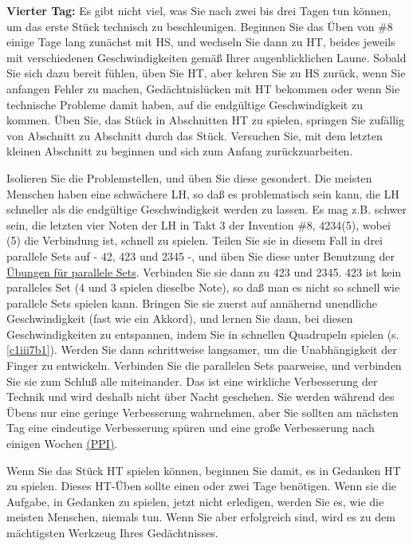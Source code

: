 \textbf{Vierter Tag:} Es gibt nicht viel, was Sie nach zwei bis drei Tagen tun können, um das erste Stück technisch zu beschleunigen.
Beginnen Sie das Üben von \#8 einige Tage lang zunächst mit HS, und wechseln Sie dann zu HT, beides jeweils mit verschiedenen Geschwindigkeiten gemäß Ihrer augenblicklichen Laune.
Sobald Sie sich dazu bereit fühlen, üben Sie HT, aber kehren Sie zu HS zurück, wenn Sie anfangen Fehler zu machen, Gedächtnislücken mit HT bekommen oder wenn Sie technische Probleme damit haben, auf die endgültige Geschwindigkeit zu kommen.
Üben Sie, das Stück in Abschnitten HT zu spielen, springen Sie zufällig von Abschnitt zu Abschnitt durch das Stück.
Versuchen Sie, mit dem letzten kleinen Abschnitt zu beginnen und sich zum Anfang zurückzuarbeiten.

Isolieren Sie die Problemstellen, und üben Sie diese gesondert.
Die meisten Menschen haben eine schwächere LH, so daß es problematisch sein kann, die LH schneller als die endgültige Geschwindigkeit werden zu lassen.
Es mag z.B. schwer sein, die letzten vier Noten der LH in Takt 3 der Invention \#8, 4234(5), wobei (5) die Verbindung ist, schnell zu spielen.
Teilen Sie sie in diesem Fall in drei parallele Sets auf - 42, 423 und 2345 -, und üben Sie diese unter Benutzung der \hyperref[c1iii7b]{Übungen für parallele Sets}.
Verbinden Sie sie dann zu 423 und 2345.
423 ist kein paralleles Set (4 und 3 spielen dieselbe Note), so daß man es nicht so schnell wie parallele Sets spielen kann.
Bringen Sie sie zuerst auf annähernd unendliche Geschwindigkeit (fast wie ein Akkord), und lernen Sie dann, bei diesen Geschwindigkeiten zu entspannen, indem Sie in schnellen Quadrupeln spielen (s. \hyperref[c1iii7b1]{\autoref{c1iii7b1}}).
Werden Sie dann schrittweise langsamer, um die Unabhängigkeit der Finger zu entwickeln.
Verbinden Sie die parallelen Sets paarweise, und verbinden Sie sie zum Schluß alle miteinander.
Das ist eine wirkliche Verbesserung der Technik und wird deshalb nicht über Nacht geschehen.
Sie werden während des Übens nur eine geringe Verbesserung wahrnehmen, aber Sie sollten am nächsten Tag eine eindeutige Verbesserung spüren und eine große Verbesserung nach einigen Wochen \hyperref[c1ii15]{(PPI)}.

Wenn Sie das Stück HT spielen können, beginnen Sie damit, es in Gedanken HT zu spielen.
Dieses HT-Üben sollte einen oder zwei Tage benötigen.
Wenn sie die Aufgabe, in Gedanken zu spielen, jetzt nicht erledigen, werden Sie es, wie die meisten Menschen, niemals tun.
Wenn Sie aber erfolgreich sind, wird es zu dem mächtigsten Werkzeug Ihres Gedächtnisses.

